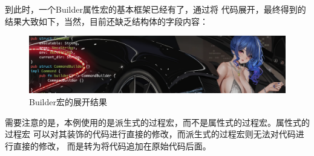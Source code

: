 到此时，一个Builder属性宏的基本框架已经有了，通过将
代码展开，最终得到的结果大致如下，当然，目前还缺乏结构体的字段内容：
\begin{figure}[H]
  \centering
  \includegraphics[width=\linewidth]{rust_expand.png}
  \caption{Builder宏的展开结果}
  \label{fig:rust_expand}
\end{figure}

需要注意的是，本例使用的是派生式的过程宏，而不是属性式的过程宏。属性式的过程宏
可以对其装饰的代码进行直接的修改，而派生式的过程宏则无法对代码进行直接的修改，
而是转为将代码追加在原始代码后面。

